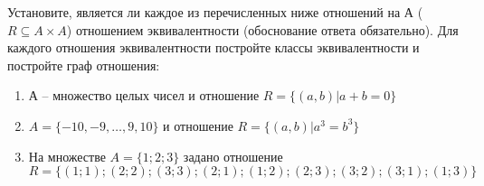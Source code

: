 \question
Установите, является ли каждое из перечисленных ниже отношений на А ($R \subseteq A \times A$) отношением эквивалентности (обоснование ответа обязательно). Для каждого отношения эквивалентности 
постройте классы эквивалентности и постройте граф отношения:
\begin{enumerate}
	\renewcommand{\labelenumi}{\alph{enumi})}
	\item А -- множество целых чисел и отношение $R = \{(a,b)|a + b = 0\}$
	\item $A = \{-10, -9, …, 9, 10\}$ и отношение $R = \{(a,b)|a^{3} = b^{3}\}$
	\item На множестве $A = \{1; 2; 3\}$ задано отношение $R = \{(1; 1); (2; 2); (3; 3); (2; 1); (1; 2); (2; 3); (3; 2); (3; 1); (1; 3)\}$
\end{enumerate}
